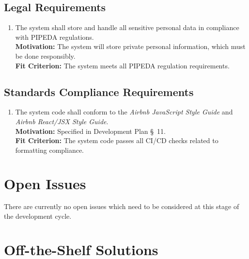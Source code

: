 \documentclass[12pt]{article}
\begin{document}
\subsection{Legal Requirements}
\begin{enumerate}[align=left,
  leftmargin=*,
  labelsep=1em,
  itemindent=0em,
  label=\bfseries LG-\arabic*:,
  ref=\bfseries LG-\arabic*]
  \item \label{CLR1} The system shall store and handle all sensitive personal data in compliance with PIPEDA regulations.\\[2mm]
    {\bf Motivation:} The system will store private personal information, which must be done responsibly.\\
    {\bf Fit Criterion:} The system meets all PIPEDA regulation requirements.\\
\end{enumerate}
\subsection{Standards Compliance Requirements}
\begin{enumerate}[align=left,
  leftmargin=*,
  labelsep=1em,
  itemindent=0em,
  label=\bfseries ST-\arabic*:,
  ref=\bfseries ST-\arabic*]
  \item \label{CSCR1} The system code shall conform to the \textit{Airbnb JavaScript Style Guide} and \textit{Airbnb React/JSX
    Style Guide}.\\[2mm]
    {\bf Motivation:} Specified in Development Plan \S \ 11.\\
    {\bf Fit Criterion:} The system code passes all CI/CD checks related to formatting compliance.\\
\end{enumerate}

\section{Open Issues}
There are currently no open issues which need to be considered at this stage of the development cycle.
\section{Off-the-Shelf Solutions}
\end{document}
